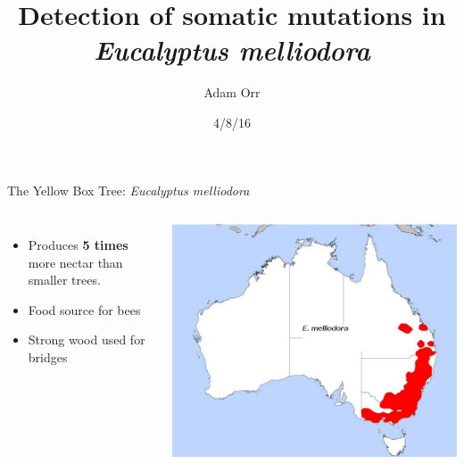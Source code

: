 \documentclass{beamer}
\title[Detecting Somatic Mutations]{Detection of somatic mutations in \textit{Eucalyptus melliodora}}
\date{4/8/16}
\author{Adam Orr}
\begin{document}
\frame{\titlepage}
\begin{frame}{The Yellow Box Tree: \textit{Eucalyptus melliodora}}

\begin{columns}
\begin{itemize}
\item Produces \textbf{5 times} more nectar than smaller trees.
\item Food source for bees
\item Strong wood used for bridges
\end{itemize}
\includegraphics[width=\linewidth]{figures/map.jpg}\footnotemark
\end{columns}
\end{frame}
\end{document}
